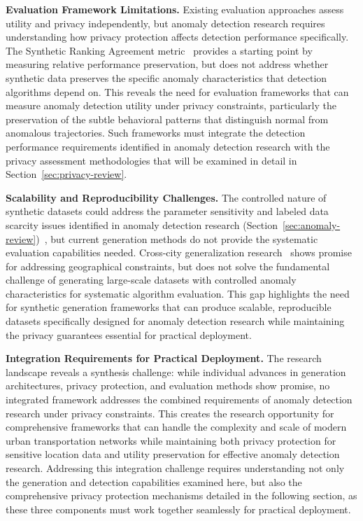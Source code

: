 \documentclass[runningheads]{llncs}
\begin{document}
\textbf{Evaluation Framework Limitations.} Existing evaluation approaches assess utility and privacy independently, but anomaly detection research requires understanding how privacy protection affects detection performance specifically. The Synthetic Ranking Agreement metric~\cite{jordon2019pate} provides a starting point by measuring relative performance preservation, but does not address whether synthetic data preserves the specific anomaly characteristics that detection algorithms depend on. This reveals the need for evaluation frameworks that can measure anomaly detection utility under privacy constraints, particularly the preservation of the subtle behavioral patterns that distinguish normal from anomalous trajectories. Such frameworks must integrate the detection performance requirements identified in anomaly detection research with the privacy assessment methodologies that will be examined in detail in Section~\ref{sec:privacy-review}.

\textbf{Scalability and Reproducibility Challenges.} The controlled nature of synthetic datasets could address the parameter sensitivity and labeled data scarcity issues identified in anomaly detection research (Section~\ref{sec:anomaly-review})~\cite{zhang2019ibat}, but current generation methods do not provide the systematic evaluation capabilities needed. Cross-city generalization research~\cite{wang2025gtg} shows promise for addressing geographical constraints, but does not solve the fundamental challenge of generating large-scale datasets with controlled anomaly characteristics for systematic algorithm evaluation. This gap highlights the need for synthetic generation frameworks that can produce scalable, reproducible datasets specifically designed for anomaly detection research while maintaining the privacy guarantees essential for practical deployment.

\textbf{Integration Requirements for Practical Deployment.} The research landscape reveals a synthesis challenge: while individual advances in generation architectures, privacy protection, and evaluation methods show promise, no integrated framework addresses the combined requirements of anomaly detection research under privacy constraints. This creates the research opportunity for comprehensive frameworks that can handle the complexity and scale of modern urban transportation networks while maintaining both privacy protection for sensitive location data and utility preservation for effective anomaly detection research. Addressing this integration challenge requires understanding not only the generation and detection capabilities examined here, but also the comprehensive privacy protection mechanisms detailed in the following section, as these three components must work together seamlessly for practical deployment.
\end{document}
